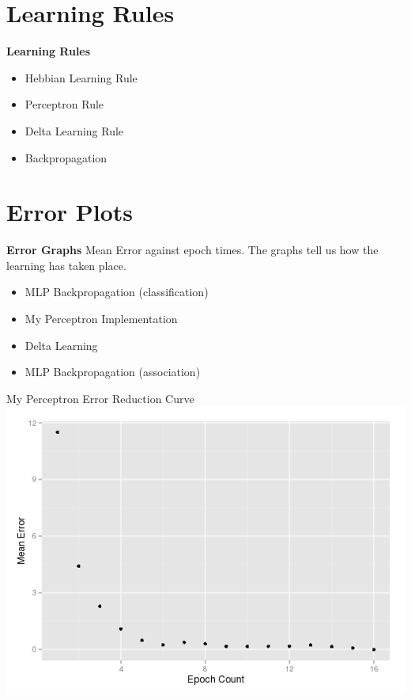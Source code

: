 \documentclass[xcolor=table]{beamer}
\begin{document}
\section{Learning Rules}
\begin{frame}
\textbf{Learning Rules}\\
\begin{itemize}
 \item Hebbian Learning Rule
 \item Perceptron Rule
 \item Delta Learning Rule
 \item Backpropagation 
\end{itemize}
\end{frame}

\section{Error Plots}
\begin{frame}
\textbf{Error Graphs}
Mean Error against epoch times. The graphs tell us how the learning has taken place. 
\begin{itemize}
 \item MLP Backpropagation (classification)
 \item My Perceptron Implementation
 \item Delta Learning
 \item MLP Backpropagation (association)
\end{itemize}
\end{frame}

\begin{frame}
 My Perceptron Error Reduction Curve\\
 \includegraphics[scale=0.4]{myPerceptronError.png}
 
\end{frame}
\end{document}
